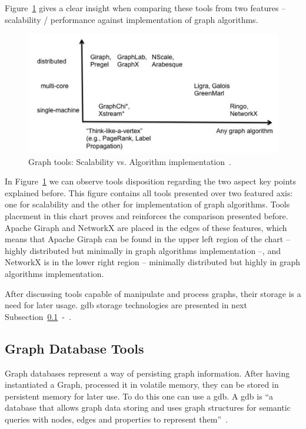 Figure~\ref{fig:graph_tools_comparison} gives a clear insight when comparing these tools from two features -- scalability / performance against implementation of graph algorithms.

\begin{figure}[H]
    \centering
    \includegraphics[width=1.0\linewidth]{images/graph_manipulation_tools_diagram_comparison.pdf}
    \caption{Graph tools: Scalability vs. Algorithm implementation~\cite{graph_data_management_systems}.}
    \label{fig:graph_tools_comparison}
\end{figure}

In Figure~\ref{fig:graph_tools_comparison} we can observe tools disposition regarding the two aspect key points explained before. This figure contains all tools presented over two featured axis: one for scalability and the other for implementation of graph algorithms. Tools placement in this chart proves and reinforces the comparison presented before. Apache Giraph and NetworkX are placed in the edges of these features, which means that Apache Giraph can be found in the upper left region of the chart -- highly distributed but minimally in graph algorithms implementation --, and NetworkX is in the lower right region -- minimally distributed but highly in graph algorithms implementation.

After discussing tools capable of manipulate and process graphs, their storage is a need for later usage. \gls{gdb} storage technologies are presented in next Subsection~\ref{subsec:graph_database_tools}~-~.

\subsection{Graph Database Tools}
\label{subsec:graph_database_tools}

Graph databases represent a way of persisting graph information. After having instantiated a Graph, processed it in volatile memory, they can be stored in persistent memory for later use. To do this one can use a \gls{gdb}. A \gls{gdb} is ``a database that allows graph data storing and uses graph structures for semantic queries with nodes, edges and properties to represent them''~\cite{Celko2013}.

